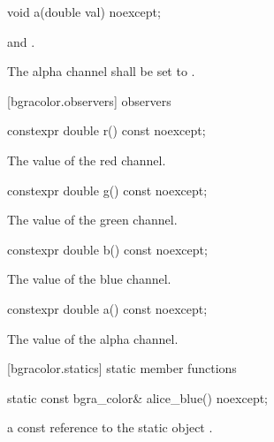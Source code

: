 \begin{itemdecl}
void a(double val) noexcept;
\end{itemdecl}
\begin{itemdescr}
\pnum
\requires
{} and .

\pnum
\effects
The alpha channel shall be set to .
\end{itemdescr}

 [bgracolor.observers]{ observers}

\begin{itemdecl}
constexpr double r() const noexcept;
\end{itemdecl}
\begin{itemdescr}
\pnum
\returns
The value of the red channel.
\end{itemdescr}

\begin{itemdecl}
constexpr double g() const noexcept;
\end{itemdecl}
\begin{itemdescr}
\pnum
\returns
The value of the green channel.
\end{itemdescr}

\begin{itemdecl}
constexpr double b() const noexcept;
\end{itemdecl}
\begin{itemdescr}
\pnum
\returns
The value of the blue channel.
\end{itemdescr}

\begin{itemdecl}
constexpr double a() const noexcept;
\end{itemdecl}
\begin{itemdescr}
\pnum
\returns
The value of the alpha channel.
\end{itemdescr}

 [bgracolor.statics] { static member functions}

\begin{itemdecl}
static const bgra_color& alice_blue() noexcept;
\end{itemdecl}
\begin{itemdescr}
\pnum
\returns
a const reference to the static  object .
\end{itemdescr}

